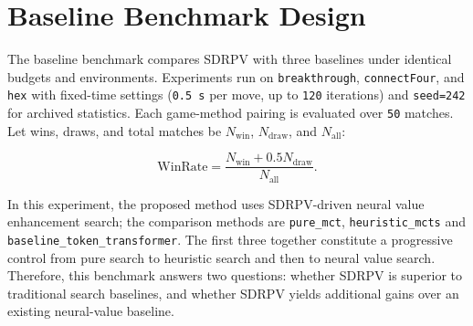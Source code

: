 \section{Baseline Benchmark Design}


The baseline benchmark compares SDRPV with three baselines under identical budgets and environments. Experiments run on \texttt{breakthrough}, \texttt{connectFour}, and \texttt{hex} with fixed-time settings (\texttt{0.5 s} per move, up to \texttt{120} iterations) and \texttt{seed=242} for archived statistics. Each game-method pairing is evaluated over \texttt{50} matches. Let wins, draws, and total matches be $N_{\mathrm{win}}$, $N_{\mathrm{draw}}$, and $N_{\mathrm{all}}$:

\begin{equation}
\mathrm{WinRate}
=
\frac{N_{\mathrm{win}}+0.5N_{\mathrm{draw}}}{N_{\mathrm{all}}}.
\end{equation}


In this experiment, the proposed method uses SDRPV-driven neural value enhancement search; the comparison methods are \texttt{pure_mct}, \texttt{heuristic_mcts} and \texttt{baseline_token_transformer}. The first three together constitute a progressive control from pure search to heuristic search and then to neural value search. Therefore, this benchmark answers two questions: whether SDRPV is superior to traditional search baselines, and whether SDRPV yields additional gains over an existing neural-value baseline.


